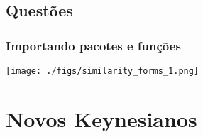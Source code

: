 \documentclass[11pt]{article}
\begin{document}
\subsection{Questões}
\label{sec:orgabc7d64}



\subsubsection{Importando pacotes e funções}
\label{sec:org223207b}

\begin{center}
\texttt{[image: ./figs/similarity\_forms\_1.png]}
\end{center}






\section{Novos Keynesianos}
\label{sec:org5c22122}
\end{document}
